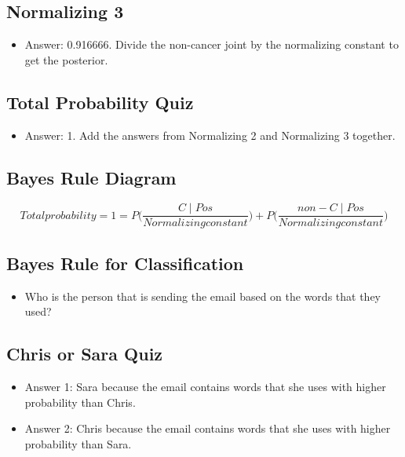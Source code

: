\documentclass[12pt]{report}
\begin{document}
\subsection{Normalizing 3}

\begin{itemize}

\item Answer: 0.916666. Divide the non-cancer joint by the normalizing constant to get the posterior. 

\end{itemize}

\subsection{Total Probability Quiz}

\begin{itemize}

\item Answer: 1. Add the answers from Normalizing 2 and Normalizing 3 together.

\end{itemize}

\subsection{Bayes Rule Diagram}

\begin{equation}
Total probability = 1 = P \big( \frac{C \mid Pos}{Normalizing constant} \big) + P\big( \frac{non-C \mid Pos}{Normalizing constant} \big)
\end{equation}


\subsection{Bayes Rule for Classification}

\begin{itemize}

\item Who is the person that is sending the email based on the words that they used? 

\end{itemize}

\subsection{Chris or Sara Quiz}

\begin{itemize}

\item Answer 1: Sara because the email contains words that she uses with higher probability than Chris. 

\item Answer 2: Chris because the email contains words that she uses with higher probability than Sara. 

\end{itemize}
\end{document}
